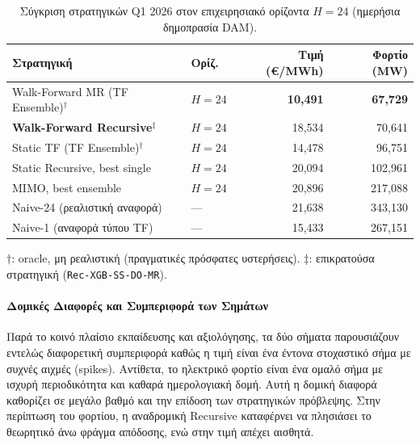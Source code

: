 \begin{table}[htbp]
\centering
\caption{Σύγκριση στρατηγικών Q1 2026 στον επιχειρησιακό ορίζοντα $H{=}24$ (ημερήσια
  δημοπρασία DAM).}
\label{tab:conc_summary}
\begin{tabular}{llrr}
\toprule
\textbf{Στρατηγική} & \textbf{Ορίζ.} & \textbf{Τιμή (€/MWh)} & \textbf{Φορτίο (MW)} \\
\midrule
Walk-Forward MR (TF Ensemble)$^{\dagger}$    & $H{=}24$ & \textbf{10,491} & \textbf{67,729} \\
\textbf{Walk-Forward Recursive}$^{\ddagger}$ & $H{=}24$ & 18,534          & 70,641 \\
Static TF (TF Ensemble)$^{\dagger}$          & $H{=}24$ & 14,478          & 96,751 \\
Static Recursive, best single                & $H{=}24$ & 20,094          & 102,961 \\
MIMO, best ensemble                           & $H{=}24$ & 20,896          & 217,088 \\
\midrule
Naive-24 (ρεαλιστική αναφορά)               & ---      & 21,638          & 343,130 \\
Naive-1 (αναφορά τύπου TF)                    & ---      & 15,433          & 267,151 \\
\bottomrule
\end{tabular}

\smallskip
{\footnotesize $\dagger$: oracle, μη ρεαλιστική (πραγματικές πρόσφατες υστερήσεις).\quad
$\ddagger$: επικρατούσα στρατηγική (\texttt{Rec-XGB-SS-DO-MR}).}
\end{table}

\paragraph{Δομικές Διαφορές και Συμπεριφορά των Σημάτων}
Παρά το κοινό πλαίσιο εκπαίδευσης και αξιολόγησης, τα δύο σήματα παρουσιάζουν εντελώς 
διαφορετική συμπεριφορά καθώς η τιμή είναι ένα έντονα στοχαστικό σήμα με συχνές αιχμές (spikes).
Αντίθετα, το ηλεκτρικό φορτίο είναι ένα ομαλό σήμα με ισχυρή περιοδικότητα και καθαρά ημερολογιακή δομή.  
Αυτή η δομική διαφορά καθορίζει σε μεγάλο βαθμό και την επίδοση των στρατηγικών πρόβλεψης. Στην περίπτωση 
του φορτίου, η αναδρομική Recursive καταφέρνει να πλησιάσει το θεωρητικό άνω φράγμα απόδοσης, ενώ στην τιμή απέχει αισθητά.  

